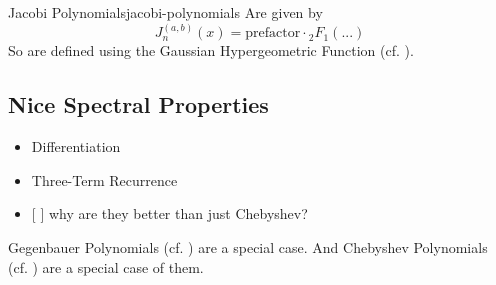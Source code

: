 \begin{definition}{Jacobi Polynomials}{jacobi-polynomials}
  Are given by \[J^{(a,b)}_n(x) = \mathrm{prefactor} \cdot {}_2F_1(...)\]
  So are defined using the Gaussian Hypergeometric Function (cf. ).

  \hypertarget{nice-spectral-properties}{%
    \subsection{Nice Spectral Properties}\label{nice-spectral-properties}}

  \begin{itemize}
    \item
          Differentiation
    \item
          Three-Term Recurrence
    \item
          {[} {]} why are they better than just Chebyshev?
  \end{itemize}

  Gegenbauer Polynomials (cf. ) are a special case. And
  Chebyshev Polynomials (cf. ) are a special case of them.
\end{definition}
